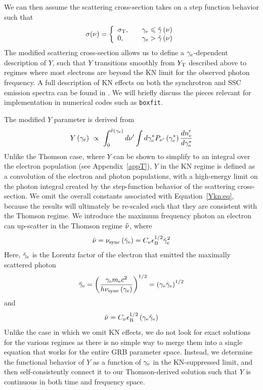 \documentclass[fleqn,usenatbib]{mnras}
\begin{document}
We can then assume the scattering cross-section takes on a step function behavior such that
\begin{equation}
\sigma(\nu) = \left\{
        \begin{array}{ll}
            \sigma_{\rm T}, & \quad \gamma_{\rm e} \leq \hat{\gamma}\left(\nu\right) \\
            0, & \quad \gamma_{\rm e} > \hat{\gamma}\left(\nu\right)
        \end{array}
    \right.
\end{equation}
The modified scattering cross-section allows us to define a $\gamma_{\rm e}$-dependent description of $Y$, such that $Y$ transitions smoothly from $Y_{\rm T}$ described above to regimes where most electrons are beyond the KN limit for the observed photon frequency. A full description of KN effects on both the synchrotron and SSC emission spectra can be found in \citet{Nakar}. We will briefly discuss the pieces relevant for implementation in numerical codes such as \texttt{boxfit}.

The modified $Y$ parameter is derived from 
\begin{equation}\label{Ykn:eq}
Y\left(\gamma_{\rm e}\right) \ \propto \  \int_{0}^{\Tilde{\nu}\left(\gamma_{\rm e}\right)}d\nu'\int d\gamma_{\rm e}^* P_{\nu'}\left(\gamma_{\rm e}^*\right)\frac{dn_e^{\prime}}{d\gamma_{\rm e}^*}
\end{equation}
Unlike the Thomson case, where $Y$ can be shown to simplify to an integral over the electron population (see Appendix~\ref{appT}), $Y$ in the KN regime is defined as a convolution of the electron and photon populations, with a high-energy limit on the photon integral created by the step-function behavior of the scattering cross-section. We omit the overall constants associated with Equation~\ref{Ykn:eq}, because the results will ultimately be re-scaled such that they are consistent with the Thomson regime. We introduce the maximum frequency photon an electron can up-scatter in the Thomson regime $\Tilde{\nu}$, where
\[
\Tilde{\nu}=\nu_{\rm sync}\left(\tilde{\gamma}_{\rm e}\right)=C_\nu \epsilon_{\rm B}^{1/2} \tilde{\gamma}_{\rm e}^2
\]
Here, $\tilde{\gamma}_{\rm e}$ is the Lorentz factor of the electron that emitted the maximally scattered photon
\[
\tilde{\gamma}_{\rm e}=\left(\frac{\gamma_{\rm e} m_{\rm e} c^2}{h \nu_{\rm sync}\left(\gamma_{\rm e}\right)}
\right)^{1/2}=\left(\gamma_{\rm e}\hat{\gamma}_{\rm e}\right)^{1/2}\]
and 
\begin{equation}
    \Tilde{\nu}=C_\nu \epsilon_{\rm B}^{1/2}\left(\gamma_{\rm e}\hat{\gamma}_{\rm e}\right)
\end{equation}
Unlike the case in which we omit KN effects, we do not look for exact solutions for the various regimes as there is no simple way to merge them into a single equation that works for the entire GRB parameter space.  Instead, we determine the functional behavior of $Y$ as a function of $\gamma_{\rm e}$ in the KN-suppressed limit, and then self-consistently connect it to our Thomson-derived solution such that $Y$ is continuous in both time and frequency space.
\end{document}
